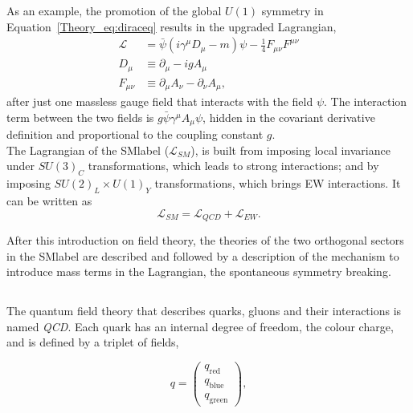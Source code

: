 As an example, the promotion of the global $U(1)$ symmetry in Equation~\ref{Theory_eq:diraceq} results in the upgraded Lagrangian,
\begin{equation}
\label{Theory_eq:diraceq20}
\begin{split}
    \mathcal{L}_{\ \ } &= \bar{\psi}(i\gamma^\mu D_\mu-m)\psi - \frac{1}{4}F_{\mu\nu}F^{\mu\nu} \\
    D_{\mu \ } &\equiv \partial_\mu -igA_\mu \\
    F_{\mu\nu} &\equiv \partial_\mu A_\nu - \partial_\nu A_\mu,
\end{split}
\end{equation}
after just one massless gauge field that interacts with the field $\psi$.
The interaction term between the two fields is $g\bar{\psi}\gamma^\mu A_\mu\psi$,
hidden in the covariant derivative definition and proportional to the coupling constant $g$.\\

The Lagrangian of the \acrshort{SMlabel} ($\mathcal{L}_{SM}$), is built from imposing local invariance under $SU(3)_C$ transformations,
which leads to strong interactions; and by imposing $SU(2)_L\times U(1)_Y$ transformations, which brings EW interactions. It can be written as
\begin{equation}
    \mathcal{L}_{SM} = \mathcal{L}_{QCD}+\mathcal{L}_{EW}.
\end{equation}

After this introduction on field theory, the theories of the two orthogonal sectors in the \acrshort{SMlabel} are described and followed by a description of the mechanism to introduce mass terms in the Lagrangian, the spontaneous symmetry breaking.

\subsection{}
\label{subsec:QCD}
The quantum field theory that describes quarks, gluons and their interactions is named \textit{\acrlong{QCD}}. Each quark has an internal degree of freedom, the colour charge, and is defined by a triplet of fields,

\begin{equation}
\label{Theory_eq:colortriplet}
    q=\begin{pmatrix}
    q_{\mathrm{red}}\\
    q_{\mathrm{blue}}\\
    q_{\mathrm{green}}
    \end{pmatrix},
\end{equation}

